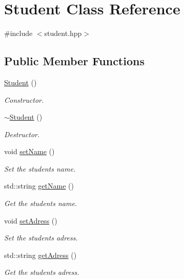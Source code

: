 \hypertarget{classStudent}{}\section{Student Class Reference}
\label{classStudent}


{\ttfamily \#include $<$student.\+hpp$>$}

\subsection*{Public Member Functions}
\begin{DoxyCompactItemize}
\item 
\hyperlink{classStudent_af9168cedbfa5565cf0b20c1a9d3f5c9d}{Student} ()
\begin{DoxyCompactList}\small\item\em Constructor. \end{DoxyCompactList}\item 
\hyperlink{classStudent_a54a8ea060d6cd04222c3a2f89829f105}{$\sim$\+Student} ()
\begin{DoxyCompactList}\small\item\em Destructor. \end{DoxyCompactList}\item 
void \hyperlink{classStudent_a5ac76288655c66ad6585540c396bf48e}{set\+Name} ()
\begin{DoxyCompactList}\small\item\em Set the student\textquotesingle{}s name. \end{DoxyCompactList}\item 
std\+::string \hyperlink{classStudent_a729c900a0e95c46f90668f527a72ad34}{get\+Name} ()
\begin{DoxyCompactList}\small\item\em Get the student\textquotesingle{}s name. \end{DoxyCompactList}\item 
void \hyperlink{classStudent_a4c6291d1e293459aa0ca6c6c003a9a8e}{set\+Adress} ()
\begin{DoxyCompactList}\small\item\em Set the student\textquotesingle{}s adress. \end{DoxyCompactList}\item 
std\+::string \hyperlink{classStudent_aeb78f390f160a1bcad595e7487cdf881}{get\+Adress} ()
\begin{DoxyCompactList}\small\item\em Get the student\textquotesingle{}s adress. \end{DoxyCompactList}\item 

\end{DoxyCompactItemize}
